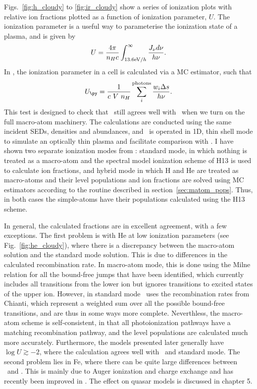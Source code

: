 Figs.~\ref{fig:h_cloudy} to \ref{fig:ir_cloudy} show a series of 
ionization plots with relative ion fractions plotted as a function of
ionization parameter, $U$. The ionization parameter is a useful
way to parameterise the ionization state of a plasma, and is given by
\begin{equation}
U = \frac{4\pi}{n_H c}\int_{13.6{\rm{eV}} / h}^{\infty}\frac{{J_{\nu}d\nu}}{h\nu}.
\label{eq:ip}
\end{equation}
In \py, the ionization parameter in a cell
is calculated via a MC estimator, such that
\begin{equation}
U_{\py} = \frac{1}{c~V~n_H} \sum_i^{\mathrm{photons}} \frac{w_i \Delta s}{h \nu}.
\end{equation}
This test is designed to check that \py\ still agrees
well with \cld\ when we turn on the full macro-atom machinery.
The calculations are conducted using the same 
incident SEDs, densities and abundances, and \py\ is operated in
1D, thin shell mode to simulate an optically thin plasma and facilitate
comparison with \cld. I have shown two separate ionization modes
from \py: standard mode, in which nothing is treated as a macro-atom
and the spectral model ionization scheme of H13 is used to calculate
ion fractions, and hybrid mode in which H and He are treated as 
macro-atoms and their level populations and ion fractions are solved
using MC estimators according to the routine
described in section~\ref{sec:matom_pops}. Thus, in both 
cases the simple-atoms have their populations calculated using the H13 scheme.

In general, the calculated fractions are in excellent agreement, with a few 
exceptions. The first problem is with He at low ionization parameters 
(see Fig.~\ref{fig:he_cloudy}), where there is a discrepancy between 
the macro-atom solution and the standard mode solution. This is due to 
differences in the calculated recombination rate. In macro-atom mode, 
this is done using the Milne relation for all the bound-free jumps that 
have been identified, which currently includes all transitions from the lower ion but
ignores transitions to excited states of the upper ion. However, 
in standard mode \py\ uses the recombination rates from Chianti,
which represent a weighted sum over all the possible bound-free transitions,
and are thus in some ways more complete. Neverthless, the macro-atom
scheme is self-consistent, in that all photoionization pathways have a matching 
recombination pathway, and the level populations are calculated much more
accurately. Furthermore, the models presented later generally have 
$\log U \gtrsim -2$, where the calculation
agrees well with \cld\ and standard mode.
The second problem lies in Fe, where there can be quite large differences
between \py\ and \cld. This is mainly due to Auger ionization and charge 
exchange and has recently been improved in \py. 
The effect on quasar models is discussed in chapter 5. 


